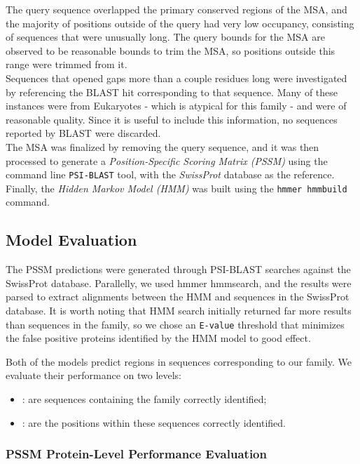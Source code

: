 \documentclass[10pt,twocolumn,letterpaper]{article}
\begin{document}
The query sequence overlapped the primary conserved regions of the MSA, and the majority of positions outside of the query had very low occupancy, consisting of sequences that were unusually long. The query bounds for the MSA are observed to be reasonable bounds to trim the MSA, so positions outside this range were trimmed from it. \\

Sequences that opened gaps more than a couple residues long were investigated by referencing the BLAST hit corresponding to that sequence. Many of these instances were from Eukaryotes - which is atypical for this family - and were of reasonable quality. Since it is useful to include this information, no sequences reported by BLAST were discarded. \\

The MSA was finalized by removing the query sequence, and it was then processed to generate a \textit{Position-Specific Scoring Matrix (PSSM)} using the command line \texttt{PSI-BLAST} tool, with the \textit{SwissProt} database as the reference. Finally, the \textit{Hidden Markov Model (HMM)} was built using the \texttt{hmmer hmmbuild} command.

\subsection{Model Evaluation}

The PSSM predictions were generated through PSI-BLAST searches against the SwissProt database.
Parallelly, we used hmmer hmmsearch, and the results were parsed to extract alignments between the HMM and sequences in the SwissProt database. It is worth noting that HMM search initially returned far more results than sequences in the family, so we chose an \texttt{E-value} threshold that minimizes the false positive proteins identified by the HMM model to good effect.

Both of the models predict regions in sequences corresponding to our family. We evaluate their performance on two levels:
\begin{itemize}
    \item {}: are sequences containing the family correctly identified;
    \item {}: are the positions within these sequences correctly identified.
\end{itemize}

\subsubsection{PSSM Protein-Level Performance Evaluation}
\end{document}
